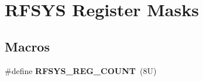 \hypertarget{group___r_f_s_y_s___register___masks}{}\section{R\+F\+S\+YS Register Masks}
\label{group___r_f_s_y_s___register___masks}
\subsection*{Macros}
\begin{DoxyCompactItemize}
\item 
\mbox{\label{group___r_f_s_y_s___register___masks_gafacec8fbd6ebad90fb7b4ac0e45b7e9a}} 
\#define {\bfseries R\+F\+S\+Y\+S\+\_\+\+R\+E\+G\+\_\+\+C\+O\+U\+NT}~(8\+U)
\end{DoxyCompactItemize}
